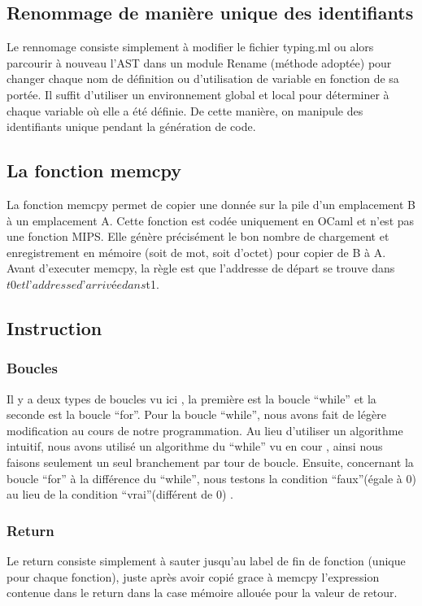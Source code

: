 \documentclass[a4paper]{report} \usepackage[utf8]{inputenc}
\begin{document}
\subsection{Renommage de manière unique des identifiants}


Le rennomage consiste simplement à modifier le fichier typing.ml ou alors parcourir à nouveau l’AST dans un module Rename (méthode adoptée) pour changer chaque nom de définition ou d’utilisation de variable en fonction de sa portée. Il suffit d’utiliser un environnement global et local pour déterminer à chaque variable où elle a été définie. De cette manière, on manipule des identifiants unique pendant la génération de code.



\subsection{La fonction memcpy}
La fonction memcpy permet de copier une donnée sur la pile d’un emplacement B à un emplacement A. Cette fonction est codée uniquement en OCaml et n’est pas une fonction MIPS. Elle génère précisément le bon nombre de chargement et enregistrement en mémoire (soit de mot, soit d’octet) pour copier de B à A. Avant d’executer memcpy, la règle est que l’addresse de départ se trouve dans $t0 et l’addresse d’arrivée dans $t1. 



\subsection{Instruction}

\subsubsection{Boucles}

Il y a deux types de boucles vu ici , la première est la boucle “while” et la seconde est la boucle “for”. 
Pour la boucle “while”, nous avons fait de légère modification au cours de notre programmation. Au lieu d’utiliser un algorithme intuitif, nous avons utilisé un algorithme du “while” vu en cour , ainsi nous faisons seulement un seul branchement par tour de boucle.
Ensuite, concernant la boucle “for” à la différence du “while”, nous testons la condition “faux”(égale à 0) au lieu de la condition “vrai”(différent de 0) .
  
\subsubsection{Return}
Le return consiste simplement à sauter jusqu’au label de fin de fonction (unique pour chaque fonction), juste après avoir copié grace à memcpy l’expression contenue dans le return dans la case mémoire allouée pour la valeur de retour. 
\end{document}
